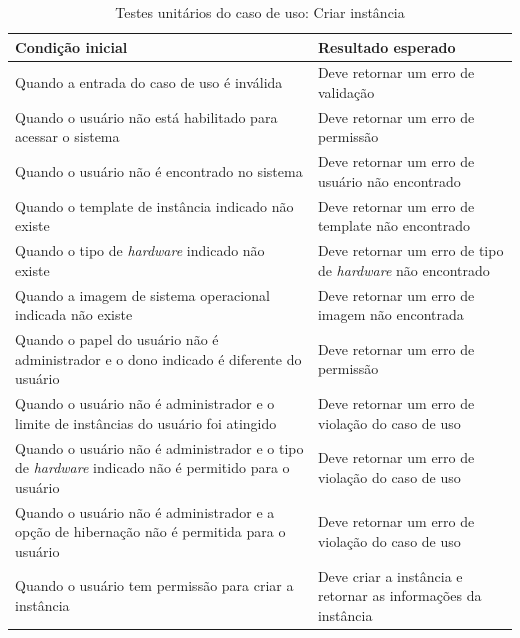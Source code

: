 \begin{table}[h]
\caption{Testes unitários do caso de uso: Criar instância}
\label{tab:testeCriarInstancia}
\begin{tabularx}{\textwidth}{p{} p{}}
\toprule
\textbf{Condição inicial} & \textbf{Resultado esperado} \\ \midrule

Quando a entrada do caso de uso é inválida & Deve retornar um erro de validação \\ \hline

Quando o usuário não está habilitado para acessar o sistema & Deve retornar um erro de permissão \\ \hline

Quando o usuário não é encontrado no sistema & Deve retornar um erro de usuário não encontrado \\ \hline

Quando o template de instância indicado não existe & Deve retornar um erro de template não encontrado \\ \hline

Quando o tipo de \textit{hardware} indicado não existe & Deve retornar um erro de tipo de \textit{hardware} não encontrado \\ \hline

Quando a imagem de sistema operacional indicada não existe & Deve retornar um erro de imagem não encontrada \\ \hline

Quando o papel do usuário não é administrador e o dono indicado é diferente do usuário & Deve retornar um erro de permissão \\ \hline

Quando o usuário não é administrador e o limite de instâncias do usuário foi atingido & Deve retornar um erro de violação do caso de uso \\ \hline

Quando o usuário não é administrador e o tipo de \textit{hardware} indicado não é permitido para o usuário & Deve retornar um erro de violação do caso de uso \\ \hline

Quando o usuário não é administrador e a opção de hibernação não é permitida para o usuário & Deve retornar um erro de violação do caso de uso \\ \hline

Quando o usuário tem permissão para criar a instância & Deve criar a instância e retornar as informações da instância \\

\bottomrule
\end{tabularx}
\end{table}

